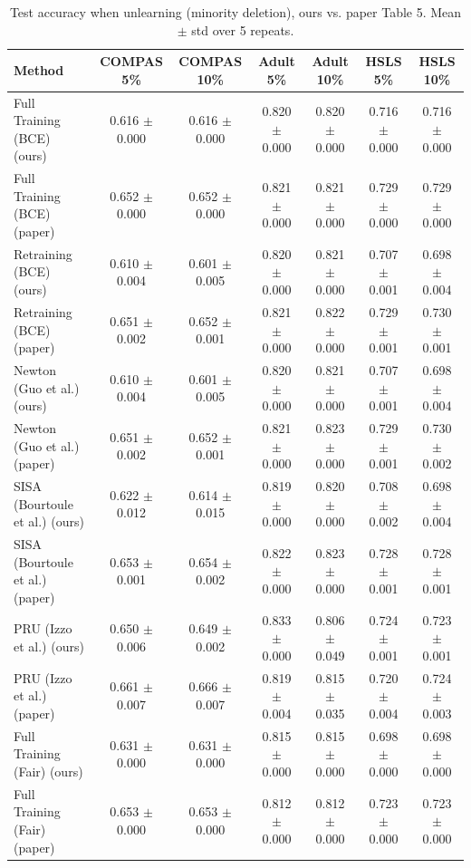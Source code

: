 \begin{table}[t]
\centering
\scriptsize
\caption{Test accuracy when unlearning (minority deletion), ours vs. paper Table 5. Mean $\pm$ std over 5 repeats.}
\label{tab:accuracy_minority}
\begin{tabular}{lcccccc}
\hline
Method & COMPAS 5\% & COMPAS 10\% & Adult 5\% & Adult 10\% & HSLS 5\% & HSLS 10\% \\
\hline
Full Training (BCE) (ours) & 0.616 $\pm$ 0.000 & 0.616 $\pm$ 0.000 & 0.820 $\pm$ 0.000 & 0.820 $\pm$ 0.000 & 0.716 $\pm$ 0.000 & 0.716 $\pm$ 0.000 \\
Full Training (BCE) (paper) & 0.652 $\pm$ 0.000 & 0.652 $\pm$ 0.000 & 0.821 $\pm$ 0.000 & 0.821 $\pm$ 0.000 & 0.729 $\pm$ 0.000 & 0.729 $\pm$ 0.000 \\
Retraining (BCE) (ours) & 0.610 $\pm$ 0.004 & 0.601 $\pm$ 0.005 & 0.820 $\pm$ 0.000 & 0.821 $\pm$ 0.000 & 0.707 $\pm$ 0.001 & 0.698 $\pm$ 0.004 \\
Retraining (BCE) (paper) & 0.651 $\pm$ 0.002 & 0.652 $\pm$ 0.001 & 0.821 $\pm$ 0.000 & 0.822 $\pm$ 0.000 & 0.729 $\pm$ 0.001 & 0.730 $\pm$ 0.001 \\
Newton (Guo et al.) (ours) & 0.610 $\pm$ 0.004 & 0.601 $\pm$ 0.005 & 0.820 $\pm$ 0.000 & 0.821 $\pm$ 0.000 & 0.707 $\pm$ 0.001 & 0.698 $\pm$ 0.004 \\
Newton (Guo et al.) (paper) & 0.651 $\pm$ 0.002 & 0.652 $\pm$ 0.001 & 0.821 $\pm$ 0.000 & 0.823 $\pm$ 0.000 & 0.729 $\pm$ 0.001 & 0.730 $\pm$ 0.002 \\
SISA (Bourtoule et al.) (ours) & 0.622 $\pm$ 0.012 & 0.614 $\pm$ 0.015 & 0.819 $\pm$ 0.000 & 0.820 $\pm$ 0.000 & 0.708 $\pm$ 0.002 & 0.698 $\pm$ 0.004 \\
SISA (Bourtoule et al.) (paper) & 0.653 $\pm$ 0.001 & 0.654 $\pm$ 0.002 & 0.822 $\pm$ 0.000 & 0.823 $\pm$ 0.000 & 0.728 $\pm$ 0.001 & 0.728 $\pm$ 0.001 \\
PRU (Izzo et al.) (ours) & 0.650 $\pm$ 0.006 & 0.649 $\pm$ 0.002 & 0.833 $\pm$ 0.000 & 0.806 $\pm$ 0.049 & 0.724 $\pm$ 0.001 & 0.723 $\pm$ 0.001 \\
PRU (Izzo et al.) (paper) & 0.661 $\pm$ 0.007 & 0.666 $\pm$ 0.007 & 0.819 $\pm$ 0.004 & 0.815 $\pm$ 0.035 & 0.720 $\pm$ 0.004 & 0.724 $\pm$ 0.003 \\
Full Training (Fair) (ours) & 0.631 $\pm$ 0.000 & 0.631 $\pm$ 0.000 & 0.815 $\pm$ 0.000 & 0.815 $\pm$ 0.000 & 0.698 $\pm$ 0.000 & 0.698 $\pm$ 0.000 \\
Full Training (Fair) (paper) & 0.653 $\pm$ 0.000 & 0.653 $\pm$ 0.000 & 0.812 $\pm$ 0.000 & 0.812 $\pm$ 0.000 & 0.723 $\pm$ 0.000 & 0.723 $\pm$ 0.000 \\

\end{tabular}
\end{table}
